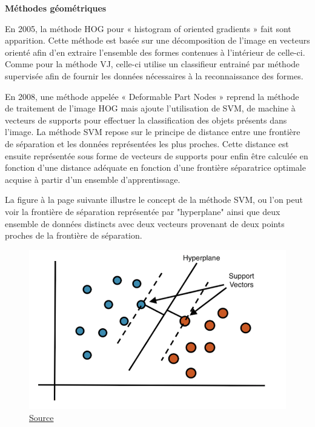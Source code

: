 \documentclass[a4paper,12pt]{article} %
\begin{document}
\textbf{Méthodes géométriques }\newline
\par
En 2005, la méthode HOG pour « histogram of oriented gradients » fait sont apparition. Cette méthode est basée sur une décomposition de l’image en vecteurs orienté afin d’en extraire l’ensemble des formes contenues à l’intérieur de celle-ci. Comme pour la méthode VJ, celle-ci utilise un classifieur entrainé par méthode supervisée afin de fournir les données nécessaires à la reconnaissance des formes. \newline
\par
En 2008, une méthode appelée « Deformable Part Nodes » reprend la méthode de traitement de l’image HOG mais ajoute l’utilisation de SVM, de machine à vecteurs de supports pour effectuer la classification des objets présents dans l’image. La méthode SVM repose sur le principe de distance entre une frontière de séparation et les données représentées les plus proches. Cette distance est ensuite représentée sous forme de vecteurs de supports pour enfin être calculée en fonction d’une distance adéquate en fonction d’une frontière séparatrice optimale acquise à partir d’un ensemble d’apprentissage.
\newline
\par
La figure à la page suivante illustre le concept de la méthode SVM, ou l'on peut voir la frontière de séparation représentée par "hyperplane" ainsi que deux ensemble de données distincts avec deux vecteurs provenant de deux points proches de la frontière de séparation. 
\begin{figure}[h] %
  \centering %
  \includegraphics[scale=0.40]{vectors.png} %
  \caption{\href{ https://ichi.pro/fr/explication-de-la-machine-vectorielle-de-support-svm-97743104690915}{Source} }
\end{figure}
\newline
\end{document}
